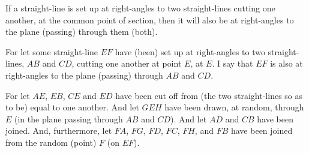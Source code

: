 \begin{Parallel}{}{}
{If a straight-line is set up at right-angles to two straight-lines cutting one another, at the common  point of section,  then it will also be
at right-angles to the plane (passing) through them (both).

\centerline{}

For let some straight-line $EF$ have (been) set up  at right-angles to two
straight-lines, $AB$ and $CD$, cutting one another at point $E$, at $E$. I say that
$EF$ is also at right-angles to the plane (passing) through $AB$ and $CD$.

For let $AE$, $EB$, $CE$ and $ED$ have been cut off from (the two straight-lines
so as to be) equal to one another. And let $GEH$ have been drawn, at random,
through $E$ (in the plane passing through $AB$ and $CD$). And let $AD$ and $CB$ have been joined. And, furthermore,
let $FA$, $FG$, $FD$, $FC$, $FH$, and $FB$ have been joined
from the random (point) $F$ (on $EF$).

}
\end{Parallel}
